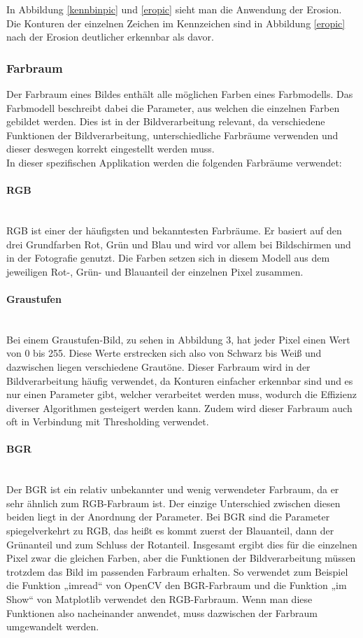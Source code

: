 In Abbildung \ref{kennbinpic} und \ref{eropic} sieht man die Anwendung der Erosion. Die Konturen der einzelnen Zeichen im Kennzeichen sind in Abbildung 
\ref{eropic} nach der Erosion deutlicher erkennbar als davor.

\subsubsection{Farbraum}
Der Farbraum eines Bildes enthält alle möglichen Farben eines Farbmodells. Das Farbmodell beschreibt dabei die Parameter, aus 
welchen die einzelnen Farben gebildet werden. Dies ist in der Bildverarbeitung relevant, da verschiedene Funktionen der 
Bildverarbeitung, unterschiedliche Farbräume verwenden und dieser deswegen korrekt eingestellt werden muss.\\

In dieser spezifischen Applikation werden die folgenden Farbräume verwendet:

\paragraph{RGB}\mbox{}\\
RGB ist einer der häufigsten und bekanntesten Farbräume. Er basiert auf den drei Grundfarben Rot, Grün und Blau und wird vor 
allem bei Bildschirmen und in der Fotografie genutzt. Die Farben setzen sich in diesem Modell aus dem jeweiligen Rot-, Grün- 
und Blauanteil der einzelnen Pixel zusammen.

\paragraph{Graustufen}\mbox{}\\
Bei einem Graustufen-Bild, zu sehen in Abbildung 3, hat jeder Pixel einen Wert von 0 bis 255. Diese Werte erstrecken sich also 
von Schwarz bis Weiß und dazwischen liegen verschiedene Grautöne. Dieser Farbraum wird in der Bildverarbeitung häufig verwendet, 
da Konturen einfacher erkennbar sind und es nur einen Parameter gibt, welcher verarbeitet werden muss, wodurch die Effizienz 
diverser Algorithmen gesteigert werden kann. Zudem wird dieser Farbraum auch oft in Verbindung mit Thresholding verwendet.

\paragraph{BGR}\mbox{}\\
Der BGR ist ein relativ unbekannter und wenig verwendeter Farbraum, da er sehr ähnlich zum RGB-Farbraum ist. Der einzige 
Unterschied zwischen diesen beiden liegt in der Anordnung der Parameter. Bei BGR sind die Parameter spiegelverkehrt zu RGB, 
das heißt es kommt zuerst der Blauanteil, dann der Grünanteil und zum Schluss der Rotanteil. Insgesamt ergibt dies für die 
einzelnen Pixel zwar die gleichen Farben, aber die Funktionen der Bildverarbeitung müssen trotzdem das Bild im passenden 
Farbraum erhalten. So verwendet zum Beispiel die Funktion „imread“ von OpenCV den BGR-Farbraum und die Funktion „im Show“ 
von Matplotlib verwendet den RGB-Farbraum. Wenn man diese Funktionen also nacheinander anwendet, muss dazwischen der Farbraum 
umgewandelt werden.

